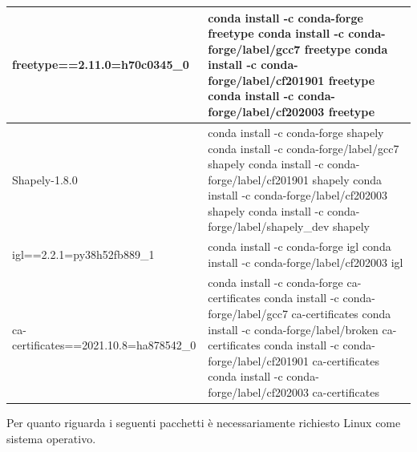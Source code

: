 \begin{tabular}{ |p{8cm}||p{8cm}|  }
  freetype==2.11.0=h70c0345\_0&	conda install -c conda-forge freetype \hline 	conda install -c conda-forge/label/gcc7 freetype \hline	conda install -c conda-forge/label/cf201901 freetype \hline	conda install -c conda-forge/label/cf202003 freetype\\
\hline

  Shapely-1.8.0&	conda install -c conda-forge shapely \hline	conda install -c conda-forge/label/gcc7 shapely \hline	conda install -c conda-forge/label/cf201901 shapely \hline	conda install -c conda-forge/label/cf202003 shapely \hline	conda install -c conda-forge/label/shapely\_dev shapely\\
\hline



  igl==2.2.1=py38h52fb889\_1&	conda install -c conda-forge igl \hline 	conda install -c conda-forge/label/cf202003 igl\\
\hline

  ca-certificates==2021.10.8=ha878542\_0&	conda install -c conda-forge ca-certificates \hline 	conda install -c conda-forge/label/gcc7 ca-certificates \hline 	conda install -c conda-forge/label/broken ca-certificates \hline 	conda install -c conda-forge/label/cf201901 ca-certificates \hline	conda install -c conda-forge/label/cf202003 ca-certificates\\
\hline


\end{tabular}


\newpage

Per quanto riguarda i seguenti pacchetti è necessariamente richiesto Linux come sistema operativo.

\medskip

